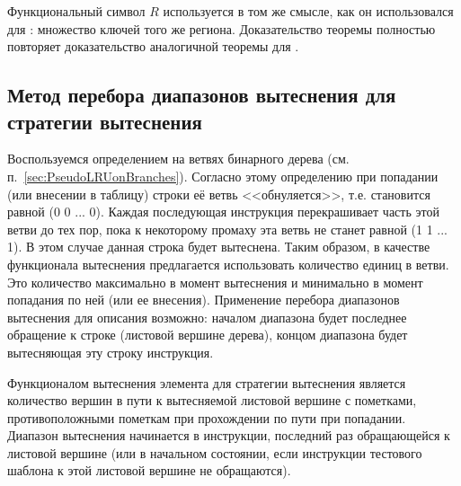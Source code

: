 Функциональный символ $R$ используется в том же смысле, как он использовался для \LRU: множество ключей того же региона. Доказательство теоремы полностью повторяет доказательство аналогичной теоремы для \LRU.

\subsection{Метод перебора диапазонов вытеснения для стратегии
вытеснения \PseudoLRU}

Воспользуемся определением \PseudoLRU на ветвях бинарного дерева
(см. п.~\ref{sec:PseudoLRUonBranches}). Согласно этому определению при попадании (или внесении в таблицу) строки её ветвь
<<обнуляется>>, т.е. становится равной (0 0 ... 0). Каждая
последующая инструкция перекрашивает часть этой ветви до тех пор,
пока к некоторому промаху эта ветвь не станет равной (1 1 ...
1). В этом случае данная строка будет вытеснена. Таким образом, в
качестве функционала вытеснения предлагается использовать количество
единиц в ветви. Это количество максимально в момент вытеснения и
минимально в момент попадания по ней (или ее внесения).
Применение перебора диапазонов вытеснения для описания \PseudoLRU
возможно: началом диапазона будет последнее обращение к строке
(листовой вершине дерева), концом диапазона будет вытесняющая эту строку
инструкция.

\begin{utv}
Функционалом вытеснения элемента для стратегии вытеснения \PseudoLRU
является количество вершин в пути к вытесняемой листовой вершине с
пометками, противоположными пометкам при прохождении по пути при
попадании. Диапазон вытеснения начинается в инструкции,
последний раз обращающейся к листовой вершине (или в начальном
состоянии, если инструкции тестового шаблона к этой листовой вершине
не обращаются).
\end{utv}


